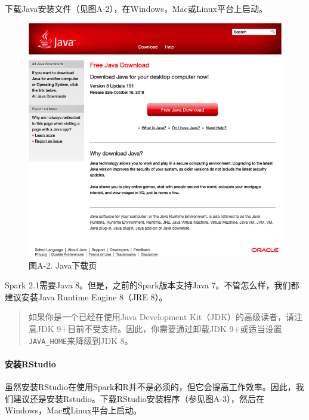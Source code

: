 \documentclass[
]{article}
\begin{document}
下载Java安装文件（见图A-2），在Windows，Mac或Linux平台上启动。

\begin{figure}
\centering
\includegraphics{figures/A_2.png}
\caption{图A-2. Java下载页}
\end{figure}

Spark 2.1需要Java 8。但是，之前的Spark版本支持Java
7。不管怎么样，我们都建议安装Java Runtime Engine 8（JRE 8）。

\begin{quote}
如果你是一个已经在使用Java Development Kit（JDK）的高级读者，请注意JDK
9+目前不受支持。因此，你需要通过卸载JDK
9+或适当设置\texttt{JAVA\_HOME}来降级到JDK 8。
\end{quote}

\hypertarget{ux5b89ux88c5rstudio}{%
\paragraph{安装RStudio}\label{ux5b89ux88c5rstudio}}

虽然安装RStudio在使用Spark和R并不是必须的，但它会提高工作效率。因此，我们建议还是安装Rstudio。下载RStudio安装程序（参见图A-3），然后在Windows，Mac或Linux平台上启动。
\end{document}
